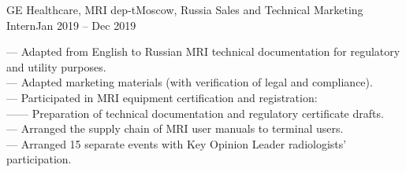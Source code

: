    \resumeSubheading
      {GE Healthcare, MRI dep-t}{Moscow, Russia}
      {Sales and Technical Marketing Intern}{Jan 2019 -- Dec 2019}
      \begin{itemize}[leftmargin=0in, label={}]
            \small{\item{
                {— Adapted from English to Russian MRI technical documentation for regulatory and utility purposes.}\\
                {— Adapted marketing materials (with verification of legal and compliance).}\\
                {— Participated in MRI equipment certification and registration:}\\
                {—— Preparation of technical documentation and regulatory certificate drafts.}\\
                {— Arranged the supply chain of MRI user manuals to terminal users.}\\
                {— Arranged 15 separate events with Key Opinion Leader radiologists' participation.}
            }}
      \end{itemize}